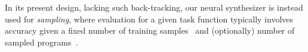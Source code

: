\documentclass{article}
\begin{document}
In its present design, lacking such back-tracking,
our neural synthesizer is instead used for \emph{sampling},
where evaluation for a given task function typically involves accuracy given a fixed number of training samples~\citep{npi} and (optionally) number of sampled programs~\citep{nsps}.%


\end{document}
